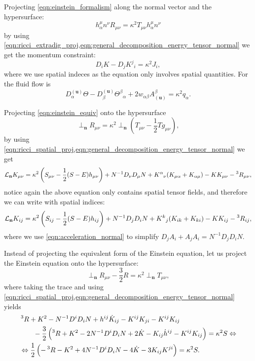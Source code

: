 Projecting \cref{eqn:einstein_formalism} along the normal vector and the hypersurface:
\begin{equation}
    h^\mu_\alpha n^\nu R_{\mu\nu}=\kappa^2 T_{\mu\nu} h^\mu_\alpha n^\nu
\end{equation}
by using \cref{eqn:ricci_extradig_proj,eqn:general_decomposition_energy_tensor_normal} we get the momentum constraint:
\begin{equation}
    D_i K - D_j K^j{}_i =\kappa^2 J_i,
\end{equation}
where we use spatial indeces as the equation only involves spatial quantities. For the fluid flow is
\begin{equation}
    D^{(\mathbf{u})}_\alpha \Theta - D^{(\mathbf{u})}_\beta \Theta^\beta{}_\alpha + 2w_{\alpha\beta}A^\beta_{(\mathbf{u})} =\kappa^2 q_\alpha.
    \label{eqn:momentum_equation_normal}
\end{equation}
 

Projecting \cref{eqn:einstein_equiv} onto the hypersurface
\begin{equation}
    \perp_{\mathbf{n}}R_{\mu\nu}=\kappa^2\perp_{\mathbf{n}}\left(T_{\mu\nu}-\frac{1}{2}T g_{\mu\nu}\right),
\end{equation}
by using \cref{eqn:ricci_spatial_proj,eqn:general_decomposition_energy_tensor_normal} we get
\begin{equation}
    \mathcal{L}_{\mathbf{n}}K_{\mu\nu}=\kappa^2\left(S_{\mu\nu}-\frac{1}{2}(S-E)h_{\mu\nu}\right)+N^{-1}D_\nu D_\mu N + K^\alpha{}_\nu(K_{\mu\alpha}+K_{\alpha\mu}) - KK_{\mu\nu}-\prescript{3}{}R_{\mu\nu},
    \nonumber
\end{equation}
notice again the above equation only contains spatial tensor fields, and therefore we can write with spatial indices:
\begin{equation}
    \mathcal{L}_{\mathbf{n}}K_{ij}=\kappa^2\left(S_{ij}-\frac{1}{2}(S-E)h_{ij}\right)+N^{-1}D_j D_i N + K^k{}_j(K_{i k}+K_{k i}) - KK_{ij}-\prescript{3}{}R_{ij},
\end{equation}
where we use \cref{eqn:acceleration_normal} to simplify $D_jA_i+A_jA_i=N^{-1}D_j D_i N$.

Instead of projecting the equivalent form of the Einstein equation, let us project the Einstein equation onto the hypersurface:
\begin{equation}
    \perp_{\mathbf{n}}R_{\mu\nu}-\frac{3}{2}R=\kappa^2  \perp_{\mathbf{n}} T_{\mu\nu},
\end{equation}
where taking the trace and using \cref{eqn:ricci_spatial_proj,eqn:general_decomposition_energy_tensor_normal} yields
\begin{align}
    &\prescript{3}{}R+K^2- N^{-1}D^i D_i N + h^{ij}\dot{K}_{ij}-K^{ij}K_{ji}-K^{ij}K_{ij}\\
    &\quad\quad- \frac{3}{2}\left(\prescript{3}{}R+K^2-  2N^{-1}D^i D_i N + 2\dot{K}-K_{ij}\dot{h}^{ij}-K^{ij}K_{ij}\right)=\kappa^2 S\Leftrightarrow\\
    &\Leftrightarrow \frac{1}{2}\left(-\prescript{3}{}R-K^2+ 4N^{-1}D^i D_i N -4 \dot{K}-3K_{ij}K^{ji}\right)=\kappa^2 S.
    \label{eqn:pressure_equation_normal}
\end{align}

